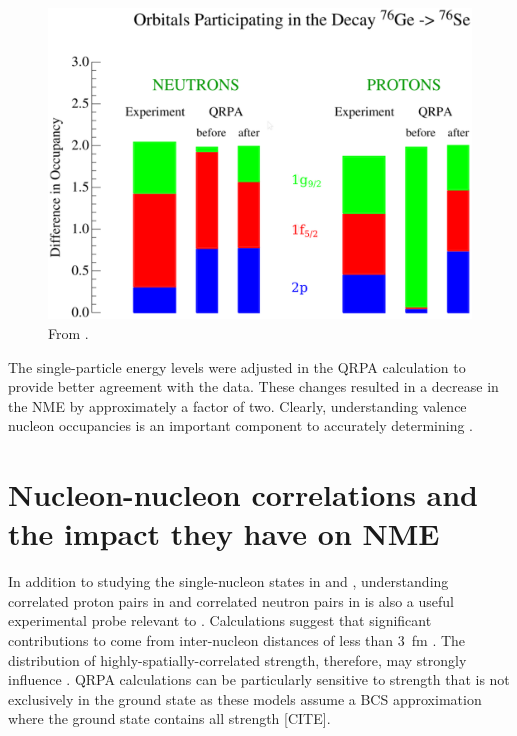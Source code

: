 \begin{figure}[htp]
\centering
\includegraphics[width=1.0\textwidth]{figures/occupancyDiffs.eps}
\caption{From \cite{schiffer_review}.}
\label{fig:occupancyDiffs}
\end{figure}
The single-particle energy levels were adjusted in the QRPA calculation \cite{SuhonenAdjustLevels} to provide better agreement with the data.  These changes resulted in a decrease in the NME by approximately a factor of two.  Clearly, understanding valence nucleon occupancies is an important component to accurately determining \NME. 


\section{Nucleon-nucleon correlations and the impact they have on NME}

In addition to studying the single-nucleon states in \GeTargets and \SeProducts, understanding correlated proton pairs in  and correlated neutron pairs in  is also a useful experimental probe relevant to \NME.  Calculations suggest that significant contributions to \NME come from inter-nucleon distances of less than 3~fm \cite{anatomy}.  The distribution of highly-spatially-correlated \zp strength, therefore, may strongly influence \NME.  QRPA calculations can be particularly sensitive to \zp strength that is not exclusively in the ground state as these models assume a BCS approximation where the ground state contains all \zp strength [CITE]. 

